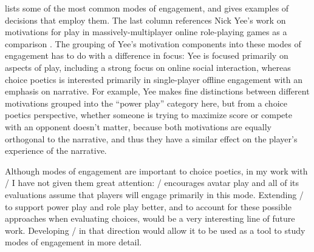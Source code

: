  lists some of the most common modes of engagement, and gives examples of decisions that employ them.
%
The last column references Nick Yee's work on motivations for play in massively-multiplayer online role-playing games as a comparison \citep{Yee2006}.
%
The grouping of Yee's motivation components into these modes of engagement has to do with a difference in focus: Yee is focused primarily on aspects of play, including a strong focus on online social interaction, whereas choice poetics is interested primarily in single-player offline engagement with an emphasis on narrative.
%
For example, Yee makes fine distinctions between different motivations grouped into the ``power play'' category here, but from a choice poetics perspective, whether someone is trying to maximize score or compete with an opponent doesn't matter, because both motivations are equally orthogonal to the narrative, and thus they have a similar effect on the player's experience of the narrative.


Although modes of engagement are important to choice poetics, in my work with \dunyazad/ I have not given them great attention: \dunyazad/ encourages avatar play and all of its evaluations assume that players will engage primarily in this mode.
%
Extending \dunyazad/ to support power play and role play better, and to account for these possible approaches when evaluating choices, would be a very interesting line of future work.
%
Developing \dunyazad/ in that direction would allow it to be used as a tool to study modes of engagement in more detail.

